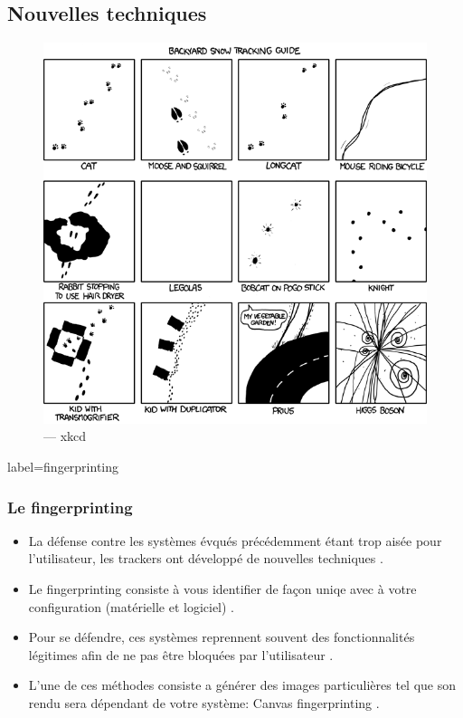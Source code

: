 \documentclass{beamer}
\begin{document}
    \subsection{Nouvelles techniques}
        \begin{frame}
            \begin{center}
                \begin{figure}
                    \includegraphics[scale=0.35]{img/snow_tracking.png}
                    \caption{\cc --- xkcd}
                \end{figure}
            \end{center}
        \end{frame}
        \begin{frame}{label=fingerprinting}
            \frametitle{Le fingerprinting}
            \begin{center}
                \begin{itemize}
                    \item La défense contre les systèmes évqués précédemment étant trop aisée pour l'utilisateur, les trackers ont développé de nouvelles techniques \cite{web}.
                    \item Le fingerprinting consiste à vous identifier de façon uniqe avec à votre configuration (matérielle et logiciel) \cite{unique}.
                    \item Pour se défendre, ces systèmes reprennent souvent des fonctionnalités légitimes afin de ne pas être bloquées par l'utilisateur \cite{canvas}.
                    \item L'une de ces méthodes consiste a générer des images particulières tel que son rendu sera dépendant de votre système: Canvas fingerprinting \cite{canvas}.
                \end{itemize}
            \end{center}
        \end{frame}
\end{document}
